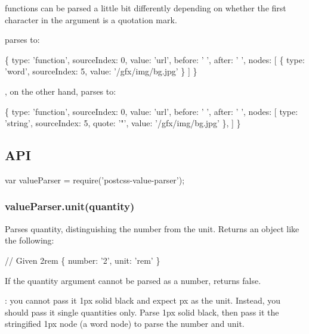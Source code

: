 { functions can be parsed a little bit differently depending on whether the first character in the argument is a quotation mark.}

{ parses to\+:}

{\ttfamily 
\begin{DoxyCode}
\{ type: 'function', sourceIndex: 0, value: 'url', before: ' ', after: ' ', nodes: [
    \{ type: 'word', sourceIndex: 5, value: '/gfx/img/bg.jpg' \}
] \}
\end{DoxyCode}
}

{, on the other hand, parses to\+:}

{\ttfamily 
\begin{DoxyCode}
\{ type: 'function', sourceIndex: 0, value: 'url', before: ' ', after: ' ', nodes: [
     type: 'string', sourceIndex: 5, quote: '"', value: '/gfx/img/bg.jpg' \},
] \}
\end{DoxyCode}
}

{\ttfamily \subsection*{A\+PI}}

{\ttfamily }

{\ttfamily 
\begin{DoxyCode}
var valueParser = require('postcss-value-parser');
\end{DoxyCode}
}

{\ttfamily \subsubsection*{value\+Parser.\+unit(quantity)}}

{\ttfamily }

{\ttfamily Parses {\ttfamily quantity}, distinguishing the number from the unit. Returns an object like the following\+:}

{\ttfamily 
\begin{DoxyCode}
// Given 2rem
\{
  number: '2',
  unit: 'rem'
\}
\end{DoxyCode}
}

{\ttfamily If the {\ttfamily quantity} argument cannot be parsed as a number, returns {\ttfamily false}.}

{\+: you cannot pass it {\ttfamily 1px solid black} and expect {\ttfamily px} as the unit. Instead, you should pass it single quantities only. Parse {\ttfamily 1px solid black}, then pass it the stringified {\ttfamily 1px} node (a {\ttfamily word} node) to parse the number and unit.}

